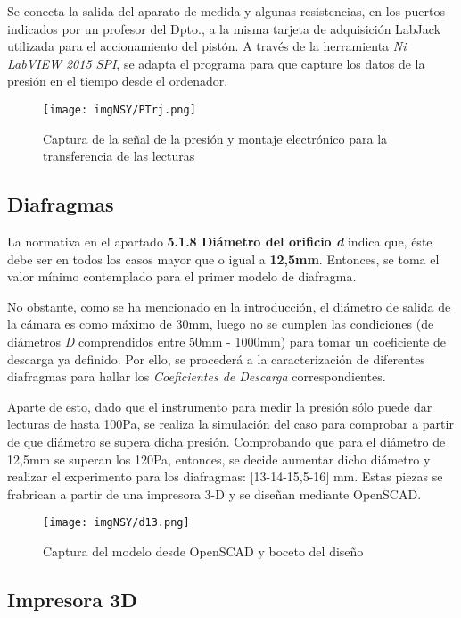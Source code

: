 Se conecta la salida del aparato de medida y algunas resistencias, en
los puertos indicados por un profesor del Dpto., a la misma tarjeta de
adquisición LabJack utilizada para el accionamiento del pistón. A través
de la herramienta \emph{Ni LabVIEW 2015 SPI}, se adapta el programa para
que capture los datos de la presión en el tiempo desde el ordenador.

\begin{figure}
\centering
\texttt{[image: imgNSY/PTrj.png]}
\caption[Adquisición de la presión]{Captura de la señal de la presión y montaje electrónico para la transferencia de las lecturas}
\label{fig:PTrj}
\end{figure}

\subsection{Diafragmas}\label{header-n208}

La normativa en el apartado \textbf{5.1.8 Diámetro del orificio
\emph{d}} indica que, éste debe ser en todos los casos mayor que o igual
a \textbf{12,5mm}. Entonces, se toma el valor mínimo contemplado para el
primer modelo de diafragma.

No obstante, como se ha mencionado en la introducción, el diámetro de
salida de la cámara es como máximo de 30mm, luego no se cumplen las
condiciones (de diámetros \emph{D} comprendidos entre 50mm - 1000mm)
para tomar un coeficiente de descarga ya definido. Por ello, se
procederá a la caracterización de diferentes diafragmas para hallar los
\emph{Coeficientes de Descarga} correspondientes.

Aparte de esto, dado que el instrumento para medir la presión sólo puede
dar lecturas de hasta 100Pa, se realiza la simulación del caso para
comprobar a partir de que diámetro se supera dicha presión. Comprobando
que para el diámetro de 12,5mm se superan los 120Pa, entonces, se decide
aumentar dicho diámetro y realizar el experimento para los diafragmas:
{[}13-14-15,5-16{]} mm. Estas piezas se frabrican a partir de una
impresora 3-D y se diseñan mediante OpenSCAD.

\begin{figure}
\centering
\texttt{[image: imgNSY/d13.png]}
\caption[Modelo diafragma]{Captura del modelo desde OpenSCAD y boceto del diseño}
\label{fig:d13}
\end{figure}

\subsection{Impresora 3D}\label{header-n221}

